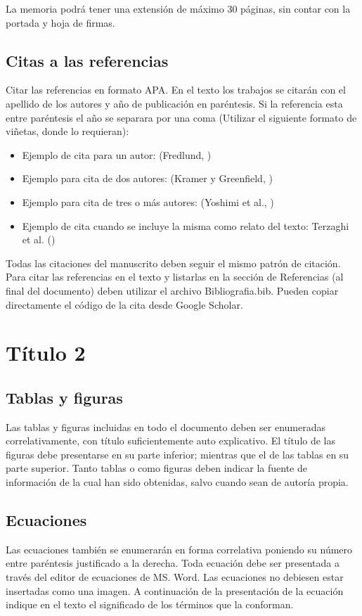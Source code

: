 \documentclass[11pt,letterpaper]{article}
\begin{document}
La memoria podrá tener una extensión de máximo 30 páginas, sin contar con la portada y hoja de firmas.

\subsection{Citas a las referencias}
Citar las referencias en formato APA. En el texto los trabajos se citarán con el apellido de los autores y año de publicación en paréntesis. Si la referencia esta entre paréntesis el año se separara por una coma (Utilizar el siguiente formato de viñetas, donde lo requieran): 
\begin{itemize}
    \item Ejemplo de cita para un autor: (Fredlund, \cite*{fredlund2006unsaturated})
    \item Ejemplo para cita de dos autores: 			(Kramer y Greenfield, \cite{kramer2017effects})
    \item Ejemplo para cita de tres o más autores:	(Yoshimi et al., \cite*{yoshimi1989liquefaction})
    \item Ejemplo de cita cuando se incluye la misma como relato del texto: Terzaghi et al. (\cite{terzaghi1996soil})
\end{itemize}

Todas las citaciones del manuscrito deben seguir el mismo patrón de citación.\\

Para citar las referencias en el texto y listarlas en la sección de Referencias (al final del documento) deben utilizar el archivo Bibliografia.bib. Pueden copiar directamente el código de la cita desde Google Scholar.


\section{Título 2}
\subsection{Tablas y figuras}
Las tablas y figuras incluidas en todo el documento deben ser enumeradas correlativamente, con título suficientemente auto explicativo. El título de las figuras debe presentarse en su parte inferior; mientras que el de las tablas en su parte superior. Tanto tablas o como figuras deben indicar la fuente de información de la cual han sido obtenidas, salvo cuando sean de autoría propia.

\subsection{Ecuaciones}
Las ecuaciones también se enumerarán en forma correlativa poniendo su número entre paréntesis justificado a la derecha. Toda ecuación debe ser presentada a través del editor de ecuaciones de MS. Word. Las ecuaciones no debiesen estar insertadas como una imagen.  A continuación de la presentación de la ecuación indique en el texto el significado de los términos que la conforman.
\end{document}
